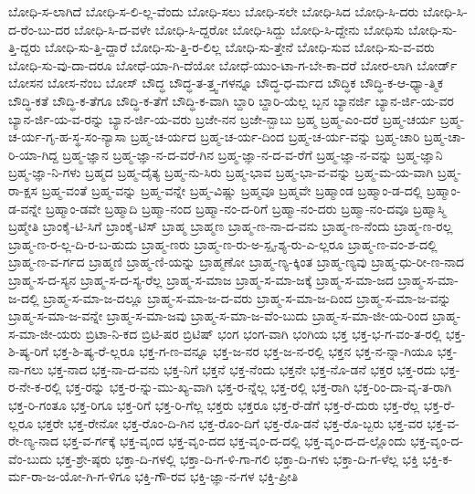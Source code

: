 {ಬೋಧಿ-ಸ-ಲಾಗಿದೆ
ಬೋಧಿ-ಸ-ಲಿ-ಲ್ಲ-ವೆಂದು
ಬೋಧಿ-ಸಲು
ಬೋಧಿ-ಸಲೇ
ಬೋಧಿ-ಸಿದ
ಬೋಧಿ-ಸಿ-ದರು
ಬೋಧಿ-ಸಿ-ದ-ರೆಂ-ಬು-ದರ
ಬೋಧಿ-ಸಿ-ದ-ವಳೇ
ಬೋಧಿ-ಸಿ-ದ್ದರೋ
ಬೋಧಿ-ಸಿದ್ದು
ಬೋಧಿ-ಸಿ-ದ್ದೇನು
ಬೋಧಿಸು
ಬೋಧಿ-ಸು-ತ್ತಿ-ದ್ದರು
ಬೋಧಿ-ಸು-ತ್ತಿ-ದ್ದಾರೆ
ಬೋಧಿ-ಸು-ತ್ತಿ-ರ-ಲಿಲ್ಲ
ಬೋಧಿ-ಸು-ತ್ತೇನೆ
ಬೋಧಿ-ಸುವ
ಬೋಧಿ-ಸು-ವ-ವರು
ಬೋಧಿ-ಸು-ವು-ದಾ-ದರೂ
ಬೋಧೆ-ಯಾ-ಗಿ-ದೆಯೋ
ಬೋಧೆ-ಯುಂ-ಟಾ-ಗ-ಬೇ-ಕಾ-ದರೆ
ಬೋರ-ಲಾಗಿ
ಬೋರ್ಡ್
ಬೋಸನ
ಬೋಸ-ನೆಂಬ
ಬೋಸ್
ಬೌದ್ಧ
ಬೌದ್ಧ-ತ-ತ್ತ್ವ-ಗಳನ್ನೂ
ಬೌದ್ಧ-ಧ-ರ್ಮದ
ಬೌದ್ಧಿಕ
ಬೌದ್ಧಿ-ಕ-ಆ-ಧ್ಯಾ-ತ್ಮಿಕ
ಬೌದ್ಧಿ-ಕತೆ
ಬೌದ್ಧಿ-ಕ-ತೆಗೂ
ಬೌದ್ಧಿ-ಕ-ತೆಗೆ
ಬೌದ್ಧಿ-ಕ-ವಾಗಿ
ಬ್ದಾರಿ
ಬ್ದಾರಿ-ಯೆಲ್ಲ
ಬ್ಬನ
ಬ್ಯಾನರ್ಜಿ
ಬ್ಯಾನ-ರ್ಜಿ-ಯ-ವರ
ಬ್ಯಾನ-ರ್ಜಿ-ಯ-ವ-ರನ್ನು
ಬ್ಯಾನ-ರ್ಜಿ-ಯ-ವರು
ಬ್ರಜೇ-ನನ
ಬ್ರಜೇ-ನ್ಬಾಬು
ಬ್ರಹ್ಮ
ಬ್ರಹ್ಮ-ಎಂ-ದರೆ
ಬ್ರಹ್ಮ-ಚರ್ಯ
ಬ್ರಹ್ಮ-ಚ-ರ್ಯ-ಗೃ-ಹ-ಸ್ಥ-ಸಂ-ನ್ಯಾಸಾ
ಬ್ರಹ್ಮ-ಚ-ರ್ಯದ
ಬ್ರಹ್ಮ-ಚ-ರ್ಯ-ದಿಂದ
ಬ್ರಹ್ಮ-ಚ-ರ್ಯ-ವನ್ನು
ಬ್ರಹ್ಮ-ಚಾರಿ
ಬ್ರಹ್ಮ-ಚಾ-ರಿ-ಯಾ-ಗಿದ್ದ
ಬ್ರಹ್ಮ-ಜ್ಞಾನ
ಬ್ರಹ್ಮ-ಜ್ಞಾ-ನ-ದ-ವರೆ-ಗಿನ
ಬ್ರಹ್ಮ-ಜ್ಞಾ-ನ-ದ-ವ-ರೆಗೆ
ಬ್ರಹ್ಮ-ಜ್ಞಾ-ನ-ವನ್ನು
ಬ್ರಹ್ಮ-ಜ್ಞಾನಿ
ಬ್ರಹ್ಮ-ಜ್ಞಾ-ನಿ-ಗಳು
ಬ್ರಹ್ಮದ
ಬ್ರಹ್ಮ-ದೈತ್ಯ
ಬ್ರಹ್ಮ-ನು-ಸಿರು
ಬ್ರಹ್ಮ-ಭಾವ
ಬ್ರಹ್ಮ-ಭಾ-ವ-ವನ್ನು
ಬ್ರಹ್ಮ-ಮ-ಯ-ವಾಗಿ
ಬ್ರಹ್ಮ-ರಾ-ಕ್ಷಸ
ಬ್ರಹ್ಮ-ವಂತೆ
ಬ್ರಹ್ಮ-ವನ್ನು
ಬ್ರಹ್ಮ-ವನ್ನೇ
ಬ್ರಹ್ಮ-ವಿಷ್ಣು
ಬ್ರಹ್ಮವೂ
ಬ್ರಹ್ಮವೇ
ಬ್ರಹ್ಮಾಂಡ
ಬ್ರಹ್ಮಾಂ-ಡ-ದಲ್ಲಿ
ಬ್ರಹ್ಮಾಂ-ಡ-ವನ್ನೇ
ಬ್ರಹ್ಮಾಂ-ಡವೇ
ಬ್ರಹ್ಮಾದಿ
ಬ್ರಹ್ಮಾ-ನಂದ
ಬ್ರಹ್ಮಾ-ನಂ-ದ-ರಿಗೆ
ಬ್ರಹ್ಮಾ-ನಂ-ದರು
ಬ್ರಹ್ಮಾ-ನಂ-ದವೂ
ಬ್ರಹ್ಮಾಸ್ಮಿ
ಬ್ರಹ್ಮೇತಿ
ಬ್ರಾಂಕೈ-ಟಿ-ಸಿಗೆ
ಬ್ರಾಂಕೈ-ಟಿಸ್
ಬ್ರಾಹ್ಮ
ಬ್ರಾಹ್ಮಣ
ಬ್ರಾಹ್ಮ-ಣ-ನಾ-ದ-ವನು
ಬ್ರಾಹ್ಮ-ಣ-ನೆಂದು
ಬ್ರಾಹ್ಮ-ಣ-ರಲ್ಲ
ಬ್ರಾಹ್ಮ-ಣ-ರ-ಲ್ಲ-ದಿ-ರ-ಬ-ಹುದು
ಬ್ರಾಹ್ಮ-ಣರು
ಬ್ರಾಹ್ಮ-ಣ-ರು-ಅ-ಸ್ಪೃ-ಶ್ಯ-ರು-ಎ-ಲ್ಲರೂ
ಬ್ರಾಹ್ಮ-ಣ-ವಂ-ಶ-ದಲ್ಲಿ
ಬ್ರಾಹ್ಮ-ಣ-ವ-ರ್ಗದ
ಬ್ರಾಹ್ಮಣಿ
ಬ್ರಾಹ್ಮ-ಣಿ-ಯನ್ನು
ಬ್ರಾಹ್ಮಣೋ
ಬ್ರಾಹ್ಮ-ಣ್ಯ-ಕ್ಕಿಂತ
ಬ್ರಾಹ್ಮ-ಣ್ಯವು
ಬ್ರಾಹ್ಮ-ಧು-ರೀ-ಣ-ನಾದ
ಬ್ರಾಹ್ಮ-ಸ-ದ-ಸ್ಯನ
ಬ್ರಾಹ್ಮ-ಸ-ದ-ಸ್ಯ-ರೆಲ್ಲ
ಬ್ರಾಹ್ಮ-ಸ-ಮಾಜ
ಬ್ರಾಹ್ಮ-ಸ-ಮಾ-ಜಕ್ಕೆ
ಬ್ರಾಹ್ಮ-ಸ-ಮಾ-ಜದ
ಬ್ರಾಹ್ಮ-ಸ-ಮಾ-ಜ-ದಲ್ಲಿ
ಬ್ರಾಹ್ಮ-ಸ-ಮಾ-ಜ-ದಲ್ಲೂ
ಬ್ರಾಹ್ಮ-ಸ-ಮಾ-ಜ-ದ-ವರು
ಬ್ರಾಹ್ಮ-ಸ-ಮಾ-ಜ-ದಿಂದ
ಬ್ರಾಹ್ಮ-ಸ-ಮಾ-ಜ-ವನ್ನು
ಬ್ರಾಹ್ಮ-ಸ-ಮಾ-ಜ-ವನ್ನೇ
ಬ್ರಾಹ್ಮ-ಸ-ಮಾ-ಜವು
ಬ್ರಾಹ್ಮ-ಸ-ಮಾ-ಜ-ವೆಂ-ಬುದು
ಬ್ರಾಹ್ಮ-ಸ-ಮಾ-ಜೀ-ಯ-ರಿಂದ
ಬ್ರಾಹ್ಮ-ಸ-ಮಾ-ಜೀ-ಯರು
ಬ್ರಿಟಾ-ನಿ-ಕದ
ಬ್ರಿಟಿ-ಷರ
ಬ್ರಿಟಿಷ್
ಭಂಗ
ಭಂಗ-ವಾಗಿ
ಭಂಗಿಯ
ಭಕ್ತ
ಭಕ್ತ-ಭ-ಗ-ವಂ-ತ-ರಲ್ಲಿ
ಭಕ್ತ-ಶಿ-ಷ್ಯ-ರಿಗೆ
ಭಕ್ತ-ಶಿ-ಷ್ಯ-ರೆ-ಲ್ಲರೂ
ಭಕ್ತ-ಗ-ಣ-ವನ್ನೂ
ಭಕ್ತ-ಜ-ನರ
ಭಕ್ತ-ಜ-ನ-ರಲ್ಲಿ
ಭಕ್ತನ
ಭಕ್ತ-ನ-ನ್ನಾ-ಗಿಯೂ
ಭಕ್ತ-ನಾ-ಗಲು
ಭಕ್ತ-ನಾದ
ಭಕ್ತ-ನಾ-ದ-ವನು
ಭಕ್ತ-ನಿಗೆ
ಭಕ್ತನೆ
ಭಕ್ತ-ನೆಂದು
ಭಕ್ತನೇ
ಭಕ್ತ-ನೊ-ಡನೆ
ಭಕ್ತರ
ಭಕ್ತ-ರದು
ಭಕ್ತ-ರ-ನೇ-ಕ-ರಲ್ಲಿ
ಭಕ್ತ-ರನ್ನು
ಭಕ್ತ-ರ-ನ್ನು-ಮು-ಖ್ಯ-ವಾಗಿ
ಭಕ್ತ-ರ-ನ್ನೆಲ್ಲ
ಭಕ್ತ-ರಲ್ಲಿ
ಭಕ್ತ-ರಾಗಿ
ಭಕ್ತ-ರಿಂ-ದಾ-ವೃ-ತ-ರಾಗಿ
ಭಕ್ತ-ರಿ-ಗಂತೂ
ಭಕ್ತ-ರಿಗೂ
ಭಕ್ತ-ರಿಗೆ
ಭಕ್ತ-ರಿ-ಗೆಲ್ಲ
ಭಕ್ತರು
ಭಕ್ತರೂ
ಭಕ್ತ-ರೆ-ಡೆಗೆ
ಭಕ್ತ-ರೆ-ದುರು
ಭಕ್ತ-ರೆಲ್ಲ
ಭಕ್ತ-ರೆ-ಲ್ಲರೂ
ಭಕ್ತರೇ
ಭಕ್ತ-ರೇನೋ
ಭಕ್ತ-ರೊಂ-ದಿ-ಗಿನ
ಭಕ್ತ-ರೊಂ-ದಿಗೆ
ಭಕ್ತ-ರೊ-ಡನೆ
ಭಕ್ತ-ರೊ-ಬ್ಬರು
ಭಕ್ತ-ವರ
ಭಕ್ತ-ವ-ರೇ-ಣ್ಯ-ನಾದ
ಭಕ್ತ-ವ-ರ್ಗಕ್ಕೆ
ಭಕ್ತ-ವೃಂದ
ಭಕ್ತ-ವೃಂ-ದದ
ಭಕ್ತ-ವೃಂ-ದ-ದಲ್ಲಿ
ಭಕ್ತ-ವೃಂ-ದ-ದ-ಲ್ಲೊಂದು
ಭಕ್ತ-ವೃಂ-ದ-ವೆಂ-ಬುದು
ಭಕ್ತ-ಶ್ರೇ-ಷ್ಠರು
ಭಕ್ತಾ-ದಿ-ಗಳಲ್ಲಿ
ಭಕ್ತಾ-ದಿ-ಗ-ಳಿ-ಗಾ-ಗಲಿ
ಭಕ್ತಾ-ದಿ-ಗಳು
ಭಕ್ತಾ-ದಿ-ಗ-ಳೆಲ್ಲ
ಭಕ್ತಿ
ಭಕ್ತಿ-ಕ-ರ್ಮ-ರಾ-ಜ-ಯೋ-ಗಿ-ಗ-ಳಿಗೂ
ಭಕ್ತಿ-ಗೌ-ರವ
ಭಕ್ತಿ-ಜ್ಞಾ-ನ-ಗಳ
ಭಕ್ತಿ-ಪ್ರೀತಿ
}
